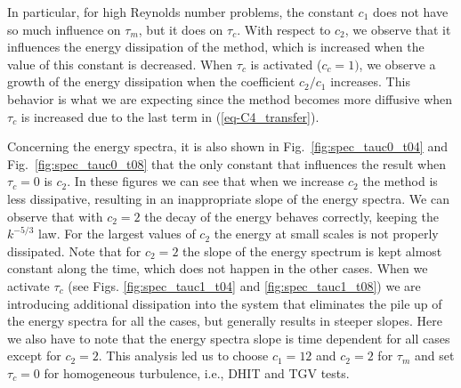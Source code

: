 In particular, for high Reynolds number problems, the constant $c_1$ does not have so much influence on $\tau_m$, but it does on $\tau_c$. With respect to $c_2$, we observe that it influences the energy dissipation of the method, which is increased when the value of this constant is decreased. When $\tau_c$ is activated ($c_c=1)$, we observe a growth of the energy dissipation when the coefficient $c_2/c_1$ increases. This behavior is what we are expecting since the method becomes more diffusive  when $\tau_c$ is increased due to the last term in (\ref{eq-C4_transfer}).


Concerning the energy spectra, it is also shown in Fig.~\ref{fig:spec_tauc0_t04} and Fig.~\ref{fig:spec_tauc0_t08} that the only constant that influences the result when $\tau_c=0$ is $c_2$. In these figures we can see that when we increase $c_2$ the method is less dissipative, resulting in an inappropriate slope of the energy spectra. We can observe that with $c_2=2$ the decay of the energy behaves correctly, keeping the $k^{-5/3}$ law. For the largest values of $c_2$ the energy at small scales is not properly dissipated. Note that for $c_2=2$ the slope of the energy spectrum is kept almost constant along the time, which does not happen in the other cases. When we activate $\tau_c$ (see Figs. \ref{fig:spec_tauc1_t04} and \ref{fig:spec_tauc1_t08}) we are introducing additional dissipation into the system that eliminates the pile up of the energy spectra for all the cases, but generally results in steeper slopes. Here we also have to note that the energy spectra slope is time dependent for all cases except for $c_2=2$.
This analysis led us to choose $c_1=12$ and $c_2=2$ for $\tau_m$ and set $\tau_c=0$ for homogeneous turbulence, i.e., DHIT and TGV tests.


